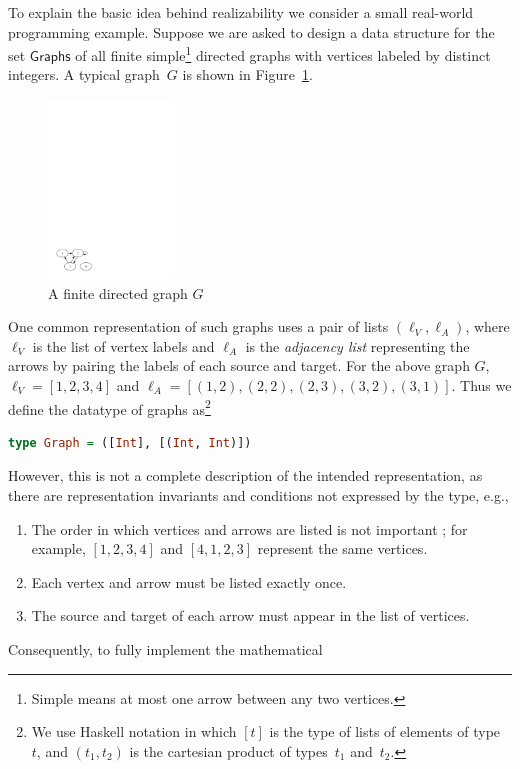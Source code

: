 To explain the basic idea behind realizability we consider a small
real-world programming example. Suppose we are asked to design a data
structure for the set $\mathsf{Graphs}$ of all finite
simple\footnote{Simple means at most one arrow between any two
  vertices.} directed graphs with vertices labeled by distinct
integers. A typical graph~$G$ is shown in Figure~\ref{fig:digraph}.
%
\begin{figure}[htp]
  \centering
  \includegraphics[width=0.3\textwidth]{digraph}
  \caption{A finite directed graph $G$}
  \label{fig:digraph}
\end{figure}
%
One common representation of such graphs uses a pair of lists
$(\ell_V, \ell_A)$, where $\ell_V$ is the list of vertex labels and
$\ell_A$ is the \emph{adjacency list} representing the arrows by
pairing the labels of each source and target. For the above graph $G$,
$\ell_V = [1, 2, 3, 4]$ and $\ell_A = [(1,2), (2,2), (2,3), (3,2),
(3,1)]$.
%
Thus we define the datatype of graphs as\footnote{We use Haskell
  notation in which $[t]$ is the type of lists of elements of
  type~$t$, and $(t_1, t_2)$ is the cartesian product of types~$t_1$
  and~$t_2$.}
%
\begin{lstlisting}[language=Haskell]
type Graph = ([Int], [(Int, Int)])
\end{lstlisting}
%
However, this is not a complete description of the intended
representation, as there are representation invariants and conditions
not expressed by the type, e.g.,
%
\begin{enumerate}
\item The order in which vertices and arrows are listed is not
  important%
; for example, $[1,2,3,4]$ and $[4,1,2,3]$ represent the same vertices.
\item Each vertex and arrow must be listed exactly once.
\item The source and target of each arrow must appear in the list of vertices.
\end{enumerate}
%
Consequently, to fully implement the mathematical
